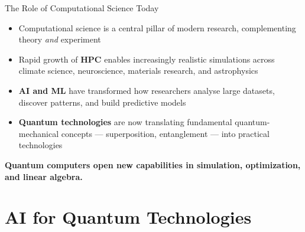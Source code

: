 \documentclass[aspectratio=169]{beamer}
\begin{document}
\begin{frame}{The Role of Computational Science Today}

  \begin{itemize}
    \item Computational science is a central pillar of modern research,
          complementing theory \emph{and} experiment
    \medskip
    \item Rapid growth of \textbf{HPC} enables increasingly realistic
          simulations across climate science, neuroscience, materials
          research, and astrophysics
    \medskip
    \item \textbf{AI and ML} have transformed how researchers analyse
          large datasets, discover patterns, and build predictive models
    \medskip
    \item \textbf{Quantum technologies} are now translating fundamental
          quantum-mechanical concepts — superposition, entanglement —
          into practical technologies
  \end{itemize}

  \bigskip
  \begin{center}
    \textcolor{mqblue}{\bfseries
    Quantum computers open new capabilities in simulation,
    optimization, and linear algebra.}
  \end{center}

\end{frame}

\section{AI for Quantum Technologies}
\end{document}
